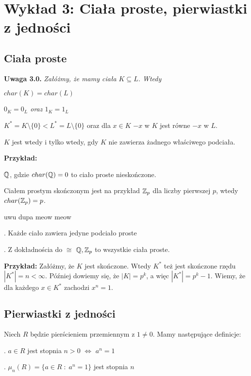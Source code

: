 
\section{Wykład 3: Ciała proste, pierwiastki z jedności}

\subsection{Ciała proste}

\textbf{\large Uwaga 3.0.}
    \emph{Załóżmy, że mamy ciała $K\subseteq L$. Wtedy}

\indent \point $char(K)=char(L)$

\indent \point \emph{$0_K=0_L$ oraz $1_K=1_L$}

\indent \point $K^*=K\setminus\{0\}<L^*=L\setminus\{0\}$ oraz dla $x\in K$ $-x$ w $K$ jest równe $-x$ w $L$.
\medskip

$K$ jest  wtedy i tylko wtedy, gdy $K$ nie zawierza żadnego właściwego podciała. 

\textbf{Przykład:}

\indent \point $\mathbb{Q}$, gdzie $char(\mathbb{Q})=0$ to ciało proste nieskończone.

\indent \point Ciałem prostym skończonym jest na przykład $\mathbb{Z}_p$ dla liczby pierwszej $p$, wtedy $char(\mathbb{Z}_p)=p$.

\begin{uwaga}{\color{back}uwu dupa meow meow}

. Każde ciało zawiera jedyne podciało proste

. Z dokładnościa do $\cong$ $\mathbb{Q},\mathbb{Z}_p$ to wszystkie ciała proste.
\end{uwaga}

\textbf{Przykład:} Załóżmy, że $K$ jest skończone. Wtedy $K^*$ też jest skończone rzędu $|K^*|=n<\infty$. Później dowiemy się, że $|K|=p^k$, a więc $|K^*|=p^k-1$. Wiemy, że dla każdego $x\in K^*$ zachodzi $x^n=1$.

\subsection{Pierwiastki z jedności}

Niech $R$ będzie pierścieniem przemiennym z $1\neq0$. Mamy następujące definicje:

. $a\in R$ jest stopnia $n>0$ $\iff$ $a^n=1$

. $\mu_n(R)=\{a\in R\;:\;a^n=1\}$ jest  stopnia $n$


